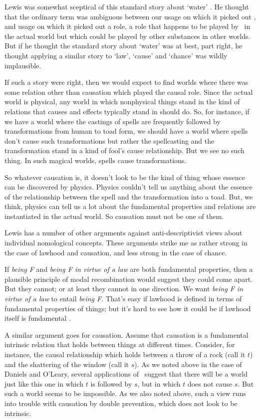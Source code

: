 Lewis was somewhat sceptical of this standard story about `water' \citep{Lewis2002b}. He thought that the ordinary term was ambiguous between our usage on which it picked out \HO,  and usage on which it picked out a role, a role that happens to be played by \HO\ in the actual world but which could be played by other substances in other worlds. But if  he thought the standard story about `water'  was at best, part right, he thought applying a similar story to `law', `cause' and `chance'  was wildly implausible.

If such a story were right, then we would expect to find worlds where there was some relation other than causation which played the causal role. Since the actual world is physical, any world in which nonphysical things stand in the kind of relations that causes and effects typically stand in should do. So, for instance, if we have a world where the castings of spells are frequently followed by transformations from human to toad form, we should have a world where spells don't cause such transformations but rather the spellcasting and the transformation stand in a kind of fool's cause relationship. But we see no such thing. In such magical worlds, spells cause transformations.

So whatever causation is, it doesn't look to be the kind of thing whose essence can be discovered by physics. Physics couldn't tell us anything about the essence of the relationship between the spell and the transformation into a toad. But, we think, physics can tell us a lot about the fundamental properties and relations are instantiated in the actual world. So causation must not be one of them.

Lewis has a number of other arguments against anti-descriptivist views about individual nomological concepts. These arguments strike me as rather strong in the case of lawhood and causation, and less strong in the case of chance.

If \textit{being F} and \textit{being F in virtue of a law} are both fundamental properties, then a plausible principle of modal recombination would suggest they could come apart. But they cannot; or at least they cannot in one direction. We want \textit{being F in virtue of a law} to entail \textit{being F}. That's easy if lawhood is defined in terms of fundamental properties of things; but it's hard to see how it could be if lawhood itself is fundamental \citep[xii]{Lewis1986b}.

A similar argument goes for causation. Assume that causation is a fundamental intrinsic relation that holds between things at different times. Consider, for instance, the causal relationship which holds between a throw of a rock (call it $t$) and the shattering of the window (call it $s$). As we noted above in the case of Daniels and O'Leary, several applications of \MC\ suggest that there will be a world just like this one in which $t$ is followed by $s$, but in which $t$ does not cause $s$. But such a world seems to be impossible. As we also noted above, such a view runs into trouble with causation by double prevention, which does not look to be intrinsic.

